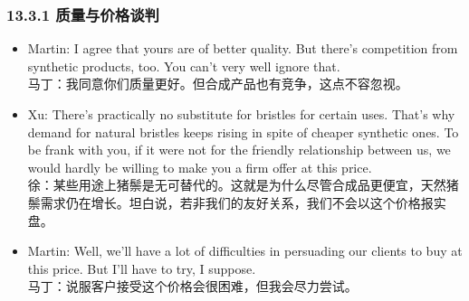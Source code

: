 \begin{frame}[allowframebreaks]
    \frametitle{13.3.1 质量与价格谈判}
    \begin{itemize}
    \item Martin: I agree that yours are of better quality. But there’s competition from synthetic products, too. You can’t very well ignore that. \\
    \small{马丁：我同意你们质量更好。但合成产品也有竞争，这点不容忽视。}
    
    \item Xu: There’s practically no substitute for bristles for certain uses. That’s why demand for natural bristles keeps rising in spite of cheaper synthetic ones. To be frank with you, if it were not for the friendly relationship between us, we would hardly be willing to make you a firm offer at this price. \\
    \small{徐：某些用途上猪鬃是无可替代的。这就是为什么尽管合成品更便宜，天然猪鬃需求仍在增长。坦白说，若非我们的友好关系，我们不会以这个价格报实盘。}
    
    \item Martin: Well, we’ll have a lot of difficulties in persuading our clients to buy at this price. But I’ll have to try, I suppose. \\
    \small{马丁：说服客户接受这个价格会很困难，但我会尽力尝试。}
    \end{itemize}
    \end{frame}
    
